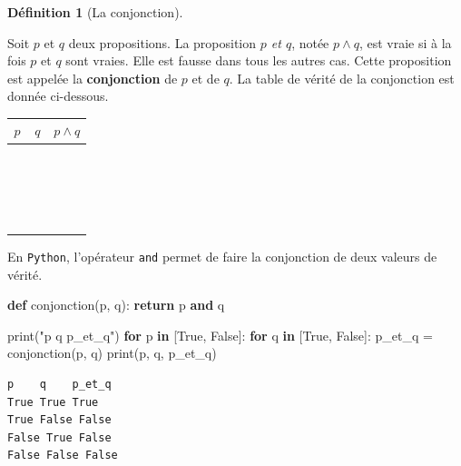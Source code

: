 \documentclass[
  letterpaper,
]{scrbook}
\newenvironment{Shaded}{}{}
\newcommand{\BuiltInTok}[1]{#1}
\newcommand{\ControlFlowTok}[1]{\textcolor[rgb]{0.00,0.44,0.13}{\textbf{#1}}}
\newcommand{\KeywordTok}[1]{\textcolor[rgb]{0.00,0.44,0.13}{\textbf{#1}}}
\newcommand{\NormalTok}[1]{#1}
\newcommand{\OperatorTok}[1]{\textcolor[rgb]{0.40,0.40,0.40}{#1}}
\newcommand{\StringTok}[1]{\textcolor[rgb]{0.25,0.44,0.63}{#1}}
\newcommand{\VariableTok}[1]{\textcolor[rgb]{0.10,0.09,0.49}{#1}}
\theoremstyle{definition}
\theoremstyle{definition}
\newtheorem{definition}{Définition}[chapter]
\theoremstyle{plain}
\theoremstyle{remark}
\begin{document}
\leavevmode{}%
\begin{definition}[La conjonction]\label{def-conjonction}

Soit \(p\) et \(q\) deux propositions. La proposition \emph{\(p\) et
\(q\)}, notée \(p\wedge q\), est vraie si à la fois \(p\) et \(q\) sont
vraies. Elle est fausse dans tous les autres cas. Cette proposition est
appelée la \textbf{conjonction} de \(p\) et de \(q\). La table de vérité
de la conjonction est donnée ci-dessous.

\begin{longtable}[]{@{}ccc@{}}
\toprule()
\(p\) & \(q\) & \(p \wedge q\) \\
\midrule()
\endhead
\(\phantom{V}\) & \(\phantom{V}\) & \(\phantom{V}\) \\
\(\phantom{V}\) & \(\phantom{V}\) & \(\phantom{V}\) \\
\(\phantom{V}\) & \(\phantom{V}\) & \(\phantom{V}\) \\
\(\phantom{V}\) & \(\phantom{V}\) & \(\phantom{V}\) \\
\bottomrule()
\end{longtable}

En \texttt{Python}, l'opérateur \texttt{and} permet de faire la
conjonction de deux valeurs de vérité.

\hypertarget{conjonction-python}{}
\begin{Shaded}
\begin{Highlighting}[]
\KeywordTok{def}\NormalTok{ conjonction(p, q):}
    \ControlFlowTok{return}\NormalTok{ p }\KeywordTok{and}\NormalTok{ q}

\BuiltInTok{print}\NormalTok{(}\StringTok{"p    q    p\_et\_q"}\NormalTok{)}
\ControlFlowTok{for}\NormalTok{ p }\KeywordTok{in}\NormalTok{ [}\VariableTok{True}\NormalTok{, }\VariableTok{False}\NormalTok{]:}
    \ControlFlowTok{for}\NormalTok{ q }\KeywordTok{in}\NormalTok{ [}\VariableTok{True}\NormalTok{, }\VariableTok{False}\NormalTok{]:}
\NormalTok{        p\_et\_q }\OperatorTok{=}\NormalTok{ conjonction(p, q)}
        \BuiltInTok{print}\NormalTok{(p, q, p\_et\_q)}
\end{Highlighting}
\end{Shaded}

\begin{verbatim}
p    q    p_et_q
True True True
True False False
False True False
False False False
\end{verbatim}

\end{definition}
\end{document}
